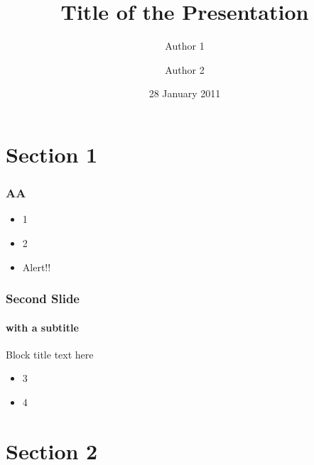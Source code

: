 \documentclass{beamer}
\title{Title of the Presentation}
\author[]{Author 1 \and Author 2}
\institute{%
  Department of Statistical Science \\ %
  University College London
}
\date{28 January 2011}
\begin{document}
\begin{frame}
  \titlepage
\end{frame}

\section{Section 1}


\begin{frame}
  \frametitle{AA}
  \begin{itemize}
  \item 1
  \item 2
    \pause
  \item \alert{Alert!!}
  \end{itemize}
\end{frame}

\begin{frame}
  \frametitle{Second Slide}
  \framesubtitle{with a subtitle}
  \begin{block}{Block title}
    text here
  \end{block}
  \begin{itemize}
  \item 3
  \item 4 
  \end{itemize}
\end{frame}

\section{Section 2}




\end{document}
